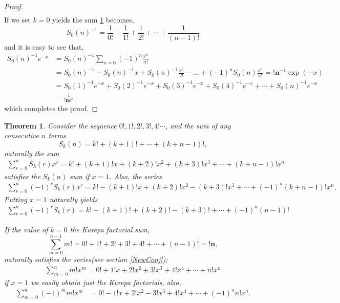 \documentclass[pdflatex,sn-mathphys-num]{sn-jnl}%
\newtheorem{theorem}{Theorem}
\theoremstyle{thmstyleone}%
\theoremstyle{thmstyletwo}%
\theoremstyle{thmstylethree}%
\begin{document}
\begin{proof}
\begin{align*}
\end{align*}
If we set $k=0$ yields the sum \ref{Sum} becomes,
 $$S_0(n)^{-1}= \frac{1}{0!}+\frac{1}{1!}+\frac{1}{2!} +\cdots+\frac{1}{(n-1)!}$$
and it is easy to see that,
\begin{align*}
S_0(n)^{-1}e^{-x} &= S_0(n)^{-1}\sum_{n=0}(-1)^n\frac{x^n}{n!}\\
&= S_0(n)^{-1} - S_0(n)^{-1}x + S_0(n)^{-1}\frac{x^2}{2!}-\ldots + (-1)^nS_0(n)\frac{x^n}{n!}= \mathbf{!n}^{-1}\exp{(-x)}\\
&= S_0(1)^{-1}e^{-x} + S_0(2)^{-1}e^{-x} + S_0(3)^{-1}e^{-x}+ S_0(4)^{-1}e^{-x}+ \cdots +S_0(n)^{-1}e^{-x}\\
&=\frac{1}{\mathbf{!n }e^x}.
\end{align*}
which completes the proof.    
\end{proof}







\begin{theorem}\label{Sum}\cite{kurepa1971left}
 Consider the sequence $0!, 1!, 2!, 3!, 4!\cdots$, and the sum of any consecutive $n$ terms $$S_k(n)= k!+(k+1)!+ \cdots+(k+n-1)!,$$ naturally the sum
\begin{align*}
        \sum_{r=0}^n S_k(r)x^r= k!+ (k+1)!x +(k+2)!x^2+ (k+3)!x^3+ \cdots+(k+n-1)!x^n
    \end{align*}
satisfies the $S_k(n)$ sum if $x=1$. Also, the series
    \begin{align*}
        \sum_{r=0}^{n} (-1)^{r}S_k(r)x^r= k!-(k+1)!x+ (k+2)!x^2 -(k+3)!x^3+\cdots+(-1)^n(k+n-1)!x^n,
    \end{align*}
Putting $x=1$ naturally yields
 \begin{align*}
        \sum_{r=0}^n (-1)^{r}S_k(r)= k!-(k+1)!+ (k+2)! -(k+3)!+\cdots+(-1)^n(n-1)!
    \end{align*}

If the value of $k=0$ the 
    Kurepa factorial sum, $$\sum_{m=0}^{n-1} m!= 0!+1!+ 2! +3!+ 4!+ \cdots+(n-1)!= \mathbf{!n},$$ naturally satisfies the series(see section \ref{NewConj});
    \begin{align*}
        \sum_{m=0}^n m!x^m= 0!+1!x+ 2!x^2 +3!x^3+ 4!x^4 +\cdots+n!x^n
    \end{align*}
    if $x=1$ we easily obtain just the Kurepa factorials, also, 
    \begin{align}\label{six}
        \sum_{m=0}^{n} (-1)^{m}m!x^m&= 0!-1!x+ 2!x^2 -3!x^3+ 4!x^4 +\cdots+(-1)^n n!x^n.
    \end{align}
\end{theorem}
\end{document}
